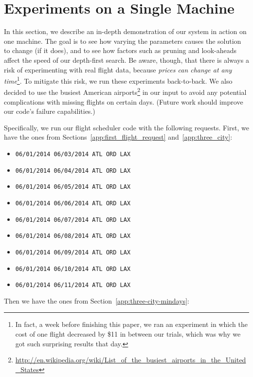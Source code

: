 \documentclass{article}
\begin{document}
\newpage
\section{Experiments on a Single Machine}\label{app:single_machine_experiment}

In this section, we describe an in-depth demonstration of our system in action on one machine. The goal is to see how varying the parameters causes
the solution to change (if it does), and to see how factors such as pruning and look-aheads affect the speed of our depth-first search. Be aware,
though, that there is always a risk of experimenting with real flight data, because \emph{prices can change at any time}\footnote{In fact, a week
before finishing this paper, we ran an experiment in which the cost of one flight decreased by \$11 in between our trials, which was why we got such
surprising results that day.}. To mitigate this risk, we run these experiments back-to-back. We also decided to use the busiest American
airports\footnote{\url{http://en.wikipedia.org/wiki/List\_of\_the\_busiest\_airports\_in\_the\_United\_States}} in our input to avoid any potential
complications with missing flights on certain days. (Future work should improve our code's failure capabilities.)

Specifically, we run our flight scheduler code with the following requests. First, we have the ones from Sections~\ref{app:first_flight_request}
and~\ref{app:three_city}:

\begin{itemize}[noitemsep]
    \item \texttt{06/01/2014 06/03/2014 ATL ORD LAX}
    \item \texttt{06/01/2014 06/04/2014 ATL ORD LAX}
    \item \texttt{06/01/2014 06/05/2014 ATL ORD LAX}
    \item \texttt{06/01/2014 06/06/2014 ATL ORD LAX}
    \item \texttt{06/01/2014 06/07/2014 ATL ORD LAX}
    \item \texttt{06/01/2014 06/08/2014 ATL ORD LAX}
    \item \texttt{06/01/2014 06/09/2014 ATL ORD LAX}
    \item \texttt{06/01/2014 06/10/2014 ATL ORD LAX}
    \item \texttt{06/01/2014 06/11/2014 ATL ORD LAX}
\end{itemize}

Then we have the ones from Section~\ref{app:three-city-mindays}:
\end{document}
